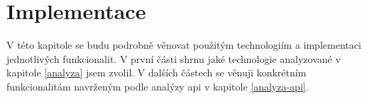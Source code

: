 \chapter{Implementace}\label{implementace}

V této kapitole se budu podrobně věnovat použitým technologiím a implementaci jednotlivých funkcionalit.
V první části shrnu jaké technologie analyzované v kapitole \ref{analyza} jsem zvolil.
V dalších částech se věnuji konkrétním funkcionalitám navrženým podle analýzy \acrshort{api} v kapitole \ref{analyza-api}.
















